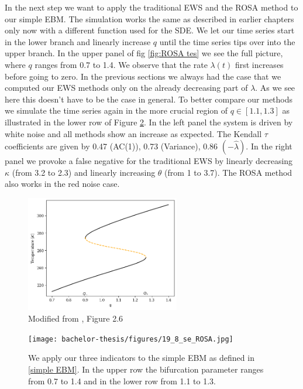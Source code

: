 \documentclass[%
thesis=student,%
coverpage=false,%
titlepage=false,%
headmarks=true, %
english,%
font=libertine, %
math=newpxtx, %
BCOR=5mm,%
coverBCOR=11mm%
]{tumbook}
\begin{document}
In the next step we want to apply the traditional EWS and the ROSA method to our simple EBM.
The simulation works the same as described in earlier chapters only now with a different function used for the SDE. We let our time series start in the lower branch and linearly increase $q$ until the time series tips over into the upper branch. In the upper panel of fig \ref{fig:ROSA tes} we see the full picture, where $q$ ranges from 0.7 to 1.4. We observe that the rate $\lambda(t)$ first increases before going to zero. In the previous sections we always had the case that we computed our EWS methods only on the already decreasing part of $\lambda$. As we see here this doesn't have to be the case in general. To better compare our methods we simulate the time series again in the more crucial region of $q \in [1.1,1.3]$ as illustrated in the lower row of Figure \ref{fig:ROSA test}. In the left panel the system is driven by white noise and all methods show an increase as expected. The Kendall $\tau$ coefficients are given by 0.47 (AC(1)), 0.73 (Variance), 0.86 $(-\widehat{\lambda})$. In the right panel we provoke a false negative for the traditional EWS by linearly decreasing $\kappa$ (from 3.2 to 2.3) and linearly increasing $\theta$ (from 1 to 3.7). The ROSA method also works in the red noise case.

\begin{figure}[t]
    \centering
    \includegraphics[width=0.6\textwidth]{bachelor-thesis/figures/se_bif_plot.png}
    \caption{Modified from \cite{Kaper:2013}, Figure 2.6}
    \label{fig:se_bif}
\end{figure}



\begin{figure}[b]
    \centering
    \texttt{[image: bachelor-thesis/figures/19\_8\_se\_ROSA.jpg]}
    \caption{We apply our three indicators to the simple EBM as defined in \ref{simple EBM}. In the upper row the bifurcation parameter ranges from 0.7 to 1.4 and in the lower row from 1.1 to 1.3. }
    \label{fig:ROSA test}
\end{figure}
\end{document}
